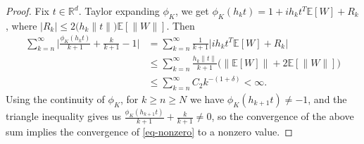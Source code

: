 \documentclass[10pt,a4paper]{amsart}
\newcommand{\E}{\mathbb{E}}
\newcommand{\R}{\mathbb{R}}
\begin{document}
\begin{proof}
Fix $t \in \R^d$. Taylor expanding $\phi_K$, we get $\phi_K(h_k t) = 1 + i h_k t^T\E[W] + R_k$, where $|R_k| \leq 2 \big(h_k\|t\|\big)\E[\|W\|]$. Then
\begin{align*}
    \sum_{k = n}^\infty \bigg|\frac{\phi_K(h_k t)}{k+1} + \frac{k}{k+1} - 1\bigg| &= \sum_{k = n}^\infty \frac{1}{k+1} \Big| ih_kt^T \E[W] + R_k\Big| \\
    &\leq \sum_{k = n}^\infty \frac{h_k \|t\|}{k+1}\Big(\|\E[W]\| + 2 \E[\|W\|]\Big) \\
    &\leq \sum_{k = n}^\infty C_2 k^{-(1+\delta)} < \infty.
\end{align*}
Using the continuity of $\phi_K$, for $k \geq n \geq N$ we have $\phi_K(h_{k+1} t) \neq -1$, and the triangle inequality gives us $\frac{\phi_K(h_{k + 1} t)}{k+1} + \frac{k}{k+1}\neq 0$, so the convergence of the above sum implies the convergence of \eqref{eq-nonzero} to a nonzero value.
\end{proof}
\end{document}
